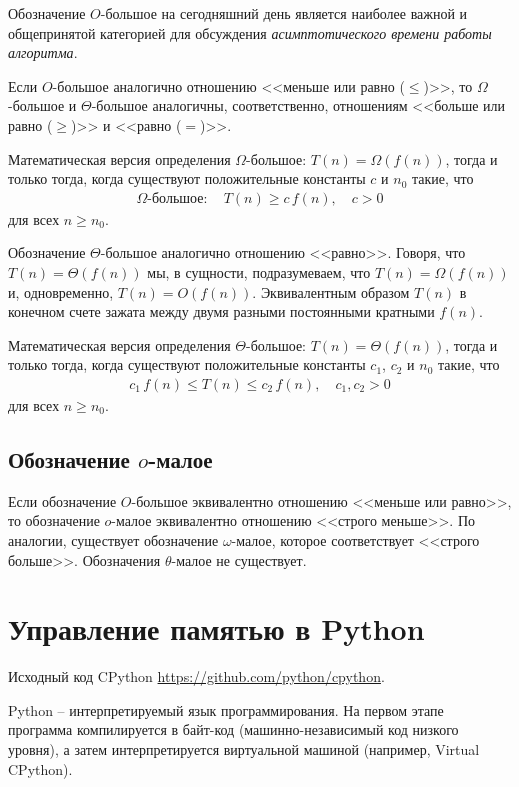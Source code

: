 \documentclass[%
	11pt,
	a4paper,
	utf8,
		]{article}
\begin{document}
Обозначение $ O $-большое на сегодняшний день является наиболее важной и общепринятой категорией для обсуждения \emph{асимптотического времени работы алгоритма}.

Если $ O $-большое аналогично отношению <<меньше или равно ($ \leqslant $)>>, то $ \Omega $-большое и $ \Theta $-большое аналогичны, соответственно, отношениям <<больше или равно ($ \geqslant $)>> и <<равно ($ = $)>>.

Математическая версия определения $ \Omega $-большое: $ T(n) = \Omega(f(n)) $, тогда и только тогда, когда существуют положительные константы $ c $ и $ n_0 $ такие, что
\begin{align*}
	\Omega\textit{-большое}: \quad T(n) \geqslant c\,f(n), \quad c > 0
\end{align*}
для всех $ n \geqslant n_0 $.

Обозначение $ \Theta $-большое аналогично отношению <<равно>>. Говоря, что $ T(n) = \Theta(f(n)) $ мы, в сущности, подразумеваем, что $ T(n) = \Omega(f(n)) $ и, одновременно, $ T(n) = O(f(n)) $. Эквивалентным образом $ T(n) $ в конечном счете зажата между двумя разными постоянными кратными $ f(n) $.

Математическая версия определения $ \Theta $-большое: $ T(n) = \Theta(f(n)) $, тогда и только тогда, когда существуют положительные константы $ c_1 $, $ c_2 $ и $ n_0 $ такие, что
\begin{align*}
	c_1\,f(n) \leqslant T(n) \leqslant c_2\,f(n), \quad c_1, c_2 > 0
\end{align*}
для всех $ n \geqslant n_0 $.

\subsection{Обозначение $ o $-малое}

Если обозначение $ O $-большое эквивалентно отношению <<меньше или равно>>, то обозначение $ o $-малое эквивалентно отношению <<строго меньше>>. По аналогии, существует обозначение $\omega$-малое, которое соответствует <<строго больше>>. Обозначения $ \theta $-малое не существует.


\section{Управление памятью в Python}

Исходный код CPython \url{https://github.com/python/cpython}.

Python -- интерпретируемый язык программирования. На первом этапе программа компилируется в байт-код (машинно-независимый код низкого уровня), а затем интерпретируется виртуальной машиной (например, Virtual CPython).
\end{document}
